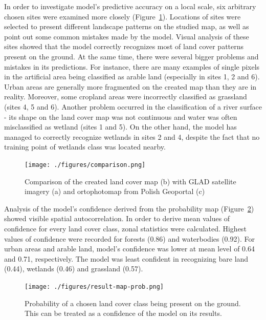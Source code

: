 \documentclass{amuthesis}
\begin{document}
In order to investigate model's predictive accuracy on a local scale,
six arbitrary chosen sites were examined more closely
(Figure~\ref{fig-rycina10}). Locations of sites were selected to present
different landscape patterns on the studied map, as well as point out
some common mistakes made by the model. Visual analysis of these sites
showed that the model correctly recognizes most of land cover patterns
present on the ground. At the same time, there were several bigger
problems and mistakes in its predictions. For instance, there are many
examples of single pixels in the artificial area being classified as
arable land (especially in sites 1, 2 and 6). Urban areas are generally
more fragmented on the created map than they are in reality. Moreover,
some cropland areas were incorrectly classified as grassland (sites 4, 5
and 6). Another problem occurred in the classification of a river
surface - its shape on the land cover map was not continuous and water
was often misclassified as wetland (sites 1 and 5). On the other hand,
the model has managed to correctly recognize wetlands in sites 2 and 4,
despite the fact that no training point of wetlands class was located
nearby.

\begin{figure}[H]

{\centering \texttt{[image: ./figures/comparison.png]}

}

\caption{\label{fig-rycina10}Comparison of the created land cover map
(b) with GLAD satellite imagery (a) and ortophotomap from Polish
Geoportal (c)}

\end{figure}

Analysis of the model's confidence derived from the probability map
(Figure~\ref{fig-rycina11}) showed visible spatial autocorrelation. In
order to derive mean values of confidence for every land cover class,
zonal statistics were calculated. Highest values of confidence were
recorded for forests (0.86) and waterbodies (0.92). For urban areas and
arable land, model's confidence was lower at mean level of 0.64 and
0.71, respectively. The model was least confident in recognizing bare
land (0.44), wetlands (0.46) and grassland (0.57).

\begin{figure}[H]

{\centering \texttt{[image: ./figures/result-map-prob.png]}

}

\caption{\label{fig-rycina11}Probability of a chosen land cover class
being present on the ground. This can be treated as a confidence of the
model on its results.}

\end{figure}
\end{document}
